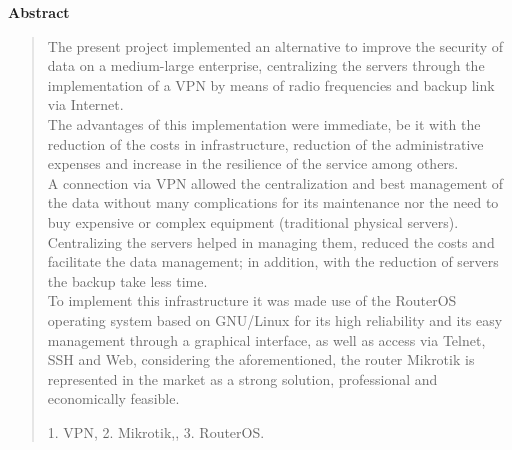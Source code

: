 \thispagestyle{empty}
\begin{center}
\begin{LARGE}
\textbf{Abstract}
\end{LARGE}
\end{center}

\begin{quotation}
The present project implemented an alternative to improve the security of data on a medium-large enterprise, centralizing the servers through the implementation of a VPN by means of radio frequencies and backup link via Internet.\\
The advantages of this implementation were immediate, be it with the reduction of the costs in infrastructure, reduction of the administrative expenses and increase in the resilience of the service among others.\\
A connection via VPN allowed the centralization and best management of the data without many complications for its maintenance nor the need to buy expensive or complex equipment (traditional physical servers).\\
Centralizing the servers helped in managing them, reduced the costs and facilitate the data management; in addition, with the reduction of servers the backup take less time.\\
To implement this infrastructure it was made use of the RouterOS operating system based on GNU/Linux for its high reliability and its easy management through a graphical interface, as well as access via Telnet, SSH and Web, considering the aforementioned, the router Mikrotik is represented in the market as a strong solution, professional and economically feasible.
\vspace*{0.5cm}

 1. VPN, 2. Mikrotik,, 3. RouterOS. 

\end{quotation}
